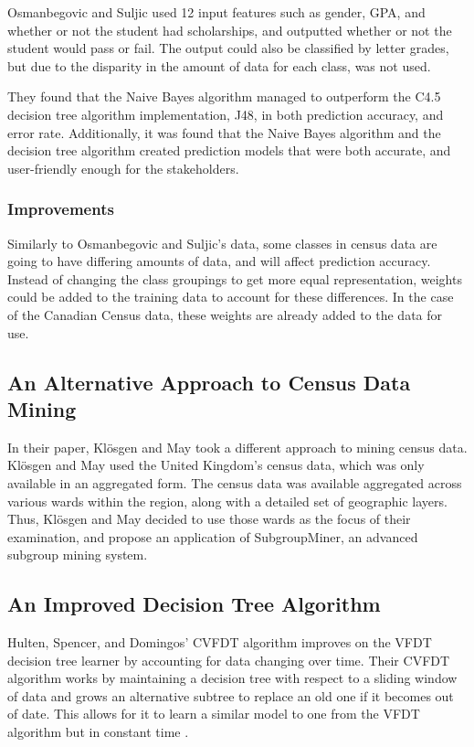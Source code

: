 \documentclass[10pt, conference, compsocconf]{IEEEtran}
\begin{document}
Osmanbegovic and Suljic used 12 input features such as gender, GPA, and whether or not the student had scholarships, and outputted whether or not the student would pass or fail. The output could also be classified by letter grades, but due to the disparity in the amount of data for each class, was not used. \cite{performance1}

They found that the Naive Bayes algorithm managed to outperform the C4.5 decision tree algorithm implementation, J48, in both prediction accuracy, and error rate. Additionally, it was found that the Naive Bayes algorithm and the decision tree algorithm created prediction models that were both accurate, and user-friendly enough for the stakeholders. \cite{performance1}

\subsubsection{Improvements}
Similarly to Osmanbegovic and Suljic's data, some classes in census data are going to have differing amounts of data, and will affect prediction accuracy. Instead of changing the class groupings to get more equal representation, weights could be added to the training data to account for these differences. In the case of the Canadian Census data, these weights are already added to the data for use.

\subsection{An Alternative Approach to Census Data Mining}
In their paper, Klösgen and May took a different approach to mining census data. Klösgen and May used the United Kingdom's census data, which was only available in an aggregated form. The census data was available aggregated across various wards within the region, along with a detailed set of geographic layers. Thus, Klösgen and May decided to use those wards as the focus of their examination, and propose an application of SubgroupMiner, an advanced subgroup mining system. \cite{census1}

\subsection{An Improved Decision Tree Algorithm}
Hulten, Spencer, and Domingos' CVFDT algorithm improves on the VFDT decision tree learner by accounting for data changing over time. \cite{dtrees1} Their CVFDT algorithm works by maintaining a decision tree with respect to a sliding window of data and grows an alternative subtree to replace an old one if it becomes out of date. This allows for it to learn a similar model to one from the VFDT algorithm but in constant time \cite{dtrees1}.
\end{document}
